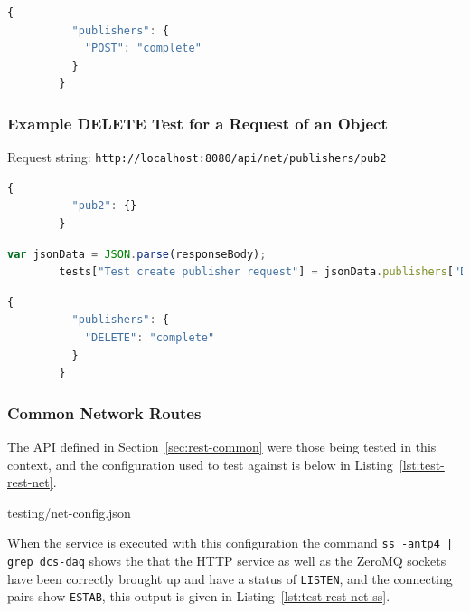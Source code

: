       \begin{lstlisting}[language=Javascript,title=POST Object Response,nolol]
        {
          "publishers": {
            "POST": "complete"
          }
        }
      \end{lstlisting}

    \subsubsection{Example DELETE Test for a Request of an Object}\label{sec:test-rest-delete}

      Request string: \texttt{http://localhost:8080/api/net/publishers/pub2}

      \begin{lstlisting}[language=Javascript,title=DELETE Object Request Body,nolol]
        {
          "pub2": {}
        }
      \end{lstlisting}

      \begin{lstlisting}[language=Javascript,title=DELETE Object Tests,nolol]
        var jsonData = JSON.parse(responseBody);
        tests["Test create publisher request"] = jsonData.publishers["DELETE"] === "complete";
      \end{lstlisting}

      \begin{lstlisting}[language=Javascript,title=DELETE Object Response,nolol]
        {
          "publishers": {
            "DELETE": "complete"
          }
        }
      \end{lstlisting}

    \subsubsection{Common Network Routes}\label{sec:test-rest-net}

      The API defined in Section~\ref{sec:rest-common} were those being tested
      in this context, and the configuration used to test against is below in
      Listing~\ref{lst:test-rest-net}.

      
                      {testing/net-config.json}

      When the service is executed with this configuration the command
      \texttt{ss -antp4 | grep dcs-daq} shows the that the HTTP service as well
      as the ZeroMQ sockets have been correctly brought up and have a status of
      \texttt{LISTEN}, and the connecting pairs show \texttt{ESTAB}, this
      output is given in Listing~\ref{lst:test-rest-net-ss}.

